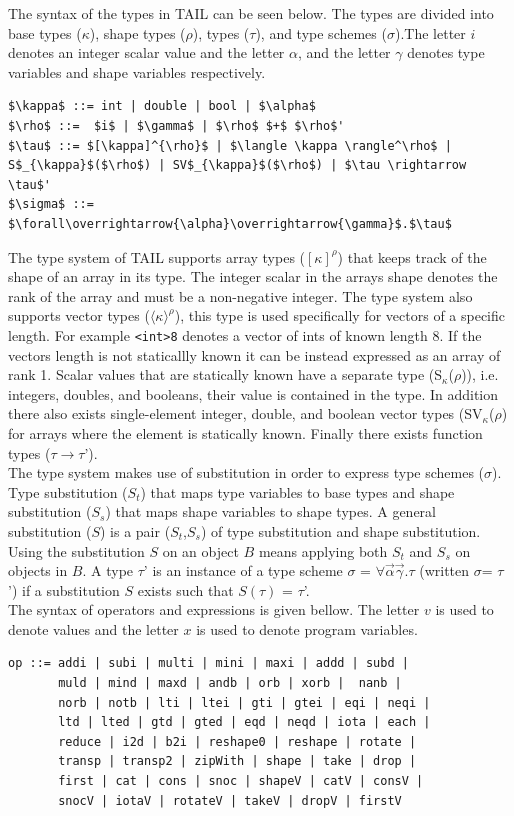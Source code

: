 \documentclass[11pt]{article}
\begin{document}
The syntax of the types in TAIL can be seen below. The types are divided into base types ($\kappa$), shape types ($\rho$), types ($\tau$), and type schemes ($\sigma$).The letter $i$ denotes an integer scalar value and the letter $\alpha$, and the letter $\gamma$ denotes type variables and shape variables respectively.
\begin{lstlisting}[numbers=none,frame=none]
$\kappa$ ::= int | double | bool | $\alpha$
$\rho$ ::=  $i$ | $\gamma$ | $\rho$ $+$ $\rho$'
$\tau$ ::= $[\kappa]^{\rho}$ | $\langle \kappa \rangle^\rho$ | S$_{\kappa}$($\rho$) | SV$_{\kappa}$($\rho$) | $\tau \rightarrow \tau$'
$\sigma$ ::= $\forall\overrightarrow{\alpha}\overrightarrow{\gamma}$.$\tau$
\end{lstlisting}
The type system of TAIL supports array types ($[\kappa]^{\rho}$) that keeps track of the shape of an array in its type.
The integer scalar in the arrays shape denotes the rank of the array and must be a non-negative integer.
The type system also supports vector types ($\langle \kappa \rangle^\rho$), this type is used specifically for vectors of a specific length. For example {\tt <int>8} denotes a vector of ints of known length 8. If the vectors length is not staticallly known it can be instead expressed as an array of rank 1.
Scalar values that are statically known have a separate type (S$_{\kappa}$($\rho$)), i.e. integers, doubles, and booleans, their value is contained in the type.
In addition there also exists single-element integer, double, and boolean vector types (SV$_{\kappa}$($\rho$) for arrays where the element is statically known.
Finally there exists function types ($\tau \rightarrow \tau$'). \\

The type system makes use of substitution in order to express type schemes ($\sigma$). Type substitution ($S_t$) that maps type variables to base types and shape substitution ($S_s$) that maps shape variables to shape types. A general substitution ($S$) is a pair ($S_t$,$S_s$) of type substitution and shape substitution. Using the substitution $S$ on an object $B$ means applying 
both $S_t$ and $S_s$ on objects in $B$. A type $\tau$' is an instance of a type scheme $\sigma$ = $\forall\overrightarrow{\alpha}\overrightarrow{\gamma}$.$\tau$ (written $\sigma$= $\tau$') if a substitution $S$ exists such that $S(\tau)$ = $\tau$'. \\

The syntax of operators and expressions is given bellow. The letter $v$ is used to denote values and the letter $x$ is used to denote program variables. 
\begin{lstlisting}[numbers=none,frame=none]
op ::= addi | subi | multi | mini | maxi | addd | subd | 
       muld | mind | maxd | andb | orb | xorb |  nanb | 
       norb | notb | lti | ltei | gti | gtei | eqi | neqi |
       ltd | lted | gtd | gted | eqd | neqd | iota | each |
       reduce | i2d | b2i | reshape0 | reshape | rotate |
       transp | transp2 | zipWith | shape | take | drop |
       first | cat | cons | snoc | shapeV | catV | consV | 
       snocV | iotaV | rotateV | takeV | dropV | firstV 
\end{lstlisting}
\end{document}
